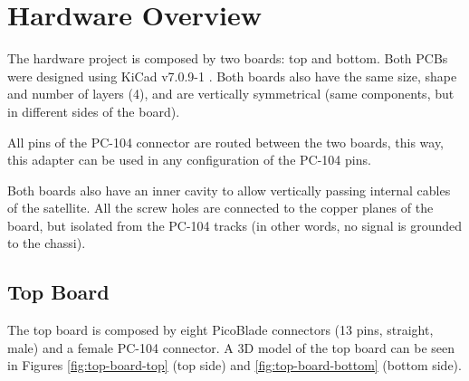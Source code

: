 %
%
%
%
%

%
%
%
%
%
%

\chapter{Hardware Overview} \label{ch:hardware}

The hardware project is composed by two boards: top and bottom. Both PCBs were designed using KiCad v7.0.9-1 \cite{kicad}. Both boards also have the same size, shape and number of layers (4), and are vertically symmetrical (same components, but in different sides of the board).

All pins of the PC-104 connector are routed between the two boards, this way, this adapter can be used in any configuration of the PC-104 pins.

Both boards also have an inner cavity to allow vertically passing internal cables of the satellite. All the screw holes are connected to the copper planes of the board, but isolated from the PC-104 tracks (in other words, no signal is grounded to the chassi).

\section{Top Board}

The top board is composed by eight PicoBlade connectors (13 pins, straight, male) and a female PC-104 connector. A 3D model of the top board can be seen in Figures \ref{fig:top-board-top} (top side) and \ref{fig:top-board-bottom} (bottom side).

